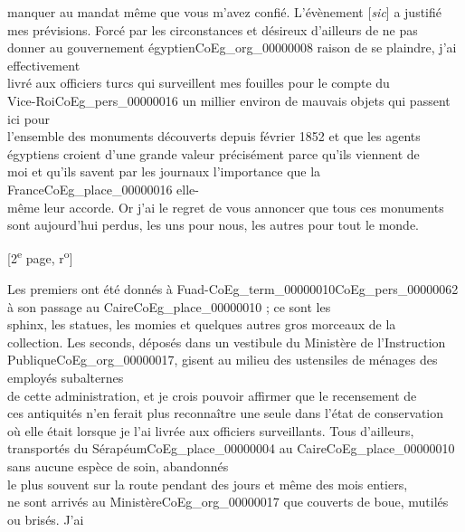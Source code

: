\documentclass{book}
\begin{document}
manquer au mandat même que vous m’avez confié. L’évènement {[\textit{sic}]} a justifié\\
mes prévisions. Forcé par les circonstances et désireux d’ailleurs de ne pas\\
donner au gouvernement égyptien\gls{CoEg_org_00000008} raison de se plaindre, j’ai effectivement\\
livré aux officiers turcs qui surveillent mes fouilles pour le compte du\\
Vice-Roi\gls{CoEg_pers_00000016} un millier environ de mauvais objets qui passent ici pour\\
l’ensemble des monuments découverts depuis février 1852 et que les agents\\
égyptiens croient d’une grande valeur précisément parce qu’ils viennent de\\
moi et qu’ils savent par les journaux l’importance que la France\gls{CoEg_place_00000016} elle-\\
même leur accorde. Or j’ai le regret de vous annoncer que tous ces monuments\\
sont aujourd’hui perdus, les uns pour nous, les autres pour tout le monde.
{\footnotesize\begin{center} {[2\textsuperscript{e} page, r\textsuperscript{o}]}\end{center}}
\noindent Les premiers ont été donnés à Fuad-\gls{CoEg_term_00000010}\gls{CoEg_pers_00000062} à son passage au Caire\gls{CoEg_place_00000010} ; ce sont les\\
sphinx, les statues, les momies et quelques autres gros morceaux de la\\
collection. Les seconds, déposés dans un vestibule du Ministère de l’Instruction\\
Publique\gls{CoEg_org_00000017}, gisent au milieu des ustensiles de ménages des employés subalternes\\
de cette administration, et je crois pouvoir affirmer que le recensement de\\
ces antiquités n’en ferait plus reconnaître une seule dans l’état de conservation\\
où elle était lorsque je l’ai livrée aux officiers surveillants. Tous d’ailleurs,\\
transportés du Sérapéum\gls{CoEg_place_00000004} au Caire\gls{CoEg_place_00000010} sans aucune espèce de soin, abandonnés\\
le plus souvent sur la route pendant des jours et même des mois entiers,\\
ne sont arrivés au Ministère\gls{CoEg_org_00000017} que couverts de boue, mutilés ou brisés. J’ai\\
\end{document}

